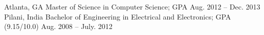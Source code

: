 
\begin{cvHeadingList}
    {Atlanta, GA}
    {Master of Science in Computer Science; GPA}
    {Aug. 2012 – Dec. 2013}
    {Pilani, India}
    {Bachelor of Engineering in Electrical and Electronics; GPA (9.15/10.0)}
    {Aug. 2008 – July. 2012}
\end{cvHeadingList}
